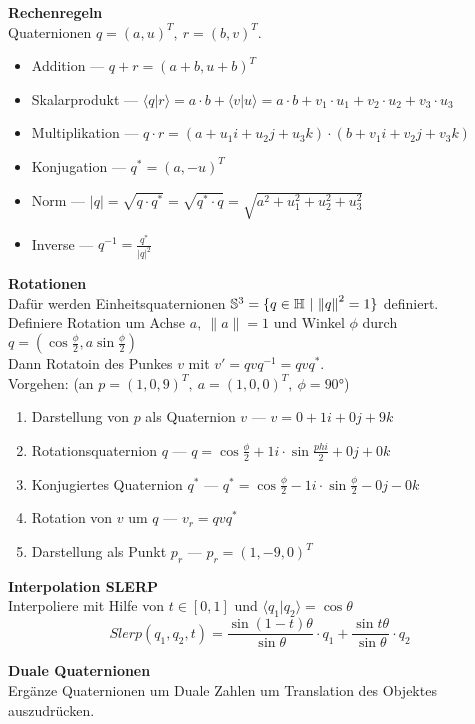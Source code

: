\textbf{Rechenregeln}\\
Quaternionen \(q = {(a, u)}^T,\ r = {(b,v)}^T\).
\begin{itemize}
\item Addition --- \(q + r = {(a + b, u + b)}^T\)
\item Skalarprodukt --- \(\langle q \lvert r\rangle = a \cdot b + \langle v \lvert u \rangle = a \cdot b + v_1 \cdot u_1 + v_2 \cdot u_2 + v_3 \cdot u_3\)
\item Multiplikation --- \(q \cdot r = (a + u_1i + u_2j + u_3k) \cdot (b + v_1 i + v_2 j + v_3 k)\)
\item Konjugation --- \(q^* = {(a, -u)}^T\)
\item Norm --- \( \lvert q \lvert = \sqrt{q \cdot q^*} = \sqrt{q^* \cdot q} = \sqrt{a^2 + u_1^2 + u_2^2 + u_3^2}\)
\item Inverse --- \( q^{-1} = \frac{q^*}{{\lvert q \lvert}^2}\)
\end{itemize}

\textbf{Rotationen}\\
Dafür werden Einheitsquaternionen \(\mathbb{S}^3 = \{q \in \quaternionen\ \lvert\ {\|{q}\|}^2 = 1\}\) definiert.\\
Definiere Rotation um Achse \(a,\ \|a\| = 1\) und Winkel \(\phi\) durch \(q = (\cos \frac{\phi}{2}, a \sin \frac{\phi}{2})\)\\
Dann Rotatoin des Punkes \(v\) mit \(v' = qvq^{-1} = qvq^*\).\\
Vorgehen: (an \(p = (1, 0, 9)^T,\ a = (1, 0, 0)^T,\ \phi = \ang{90}\))
\begin{enumerate}
\item Darstellung von \(p\) als Quaternion \(v\) --- \(v = 0 + 1i + 0j + 9k\)
\item Rotationsquaternion \(q\) --- \( q = \cos \frac{\phi}{2} + 1i \cdot \sin \frac{phi}{2} + 0j + 0k\)
\item Konjugiertes Quaternion \(q^*\) --- \(q^* = \cos \frac{\phi}{2} - 1i \cdot \sin \frac{\phi}{2} - 0j -0k\)
\item Rotation von \(v\) um \(q\) --- \(v_r = qvq^*\)
\item Darstellung als Punkt \(p_r\) --- \(p_r = (1, -9, 0)^T\)
\end{enumerate}

\textbf{Interpolation SLERP}\\
Interpoliere mit Hilfe von \(t \in [0, 1]\) und \(\langle q_1 \lvert q_2 \rangle = \cos \theta\)
\[ \mathit{Slerp}(q_1, q_2, t) = \frac{\sin(1-t)\theta}{\sin \theta} \cdot q_1 + \frac{\sin t\theta}{\sin \theta} \cdot q_2 \]

\textbf{Duale Quaternionen}\\
Ergänze Quaternionen um Duale Zahlen um Translation des Objektes auszudrücken.